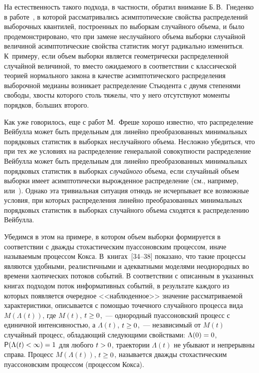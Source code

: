 \begin{multicols}{2}
На естественность такого подхода, в частности, обратил внимание
Б.\,В.~Гнеденко в работе~\cite{Gnedenko1989}, в которой
рассматривались асимптотические свойства распределений выборочных
квантилей, построенных по выборкам случайного объема, и было
продемонстрировано, что при замене неслучайного объема выборки
случайной величиной асимптотические свойства статистик могут
радикально измениться. К~примеру, если объем выборки является
геометрически распределенной случайной величиной, то вместо
ожидаемого в соответствии с классической теорией нормального закона
в качестве асимптотического распределения выборочной медианы
возникает распределение Стьюдента с двумя степенями свободы, хвосты
которого столь тяжелы, что у него отсутствуют моменты порядков,
б$\acute{\mbox{о}}$льших второго.

Как уже говорилось, еще с работ М.~Фреше хорошо известно, что
распределение Вейбулла может быть предельным для линейно
преобразованных минимальных порядковых статистик в выборках
неслучайного объема. Несложно убедиться, что при тех же условиях на
распределение генеральной совокупности распределение Вейбулла может
быть предельным для линейно преобразованных минимальных порядковых
статистик в выборках {\it случайного} объема, если случайный объем
выборки имеет асимптотически вырожденное распределение (см.,
например,~\cite{Galambos1984} или~\cite{KorolevSokolov2008}). Однако
эта тривиальная ситуация отнюдь не исчерпывает все возможные
условия, при которых распределения линейно преобразованных
минимальных порядковых статистик в выборках случайного объема
сходятся к распределению Вейбулла.

Убедимся в этом на примере, в котором объем выборки формируется в
соответствии с дважды стохастическим пуассоновским процессом, иначе
называемым процессом Кокса. В~книгах~[34--38] показано, что
такие процессы являются удобными, реалистичными и адекватными
моделями неоднородных во времени хаотических потоков событий. В
соответствии с описанным в указанных книгах подходом поток
информативных событий, в результате каждого из которых появляется
очередное <<наблюденное>> значение рассматриваемой характеристики,
описывается с помощью точечного случайного процесса вида
$M(\Lambda(t))$, где $M(t)$, $t\hm\geq0$,~--- однородный пуассоновский
процесс с единичной интенсивностью, а $\Lambda(t)$, $t\hm\geq0$,~---
независимый от $M(t)$ случайный процесс, обладающий следующими
свойствами: $\Lambda(0)\hm=0$, ${\sf P}(\Lambda(t)\hm<\infty)\hm=1$ для
любого $t\hm>0$, траектории $\Lambda(t)$ не убывают и непрерывны
справа. Процесс $M(\Lambda(t))$, $t\hm\geq0$, называется дважды
стохастическим пуассоновским процессом (процессом Кокса).


\end{multicols}
